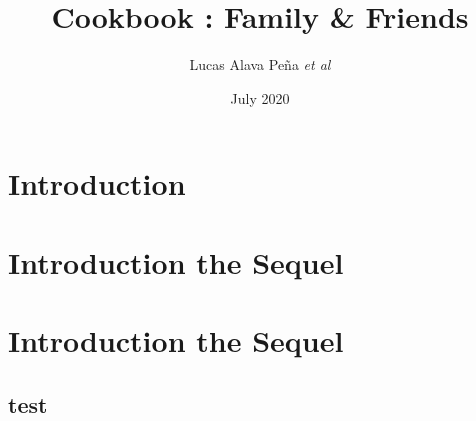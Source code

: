 \documentclass[18pt]{book}
\title{Cookbook : Family \& Friends}
\author{Lucas Alava Peña \textit{et al}}
\date{July 2020}
\begin{document}
\frontmatter






\tableofcontents

\mainmatter
\chapter{Introduction}


\chapter{Introduction the Sequel}

\blindtext

\chapter{Introduction the Sequel}

\section{test}

\blindtext

\backmatter
\end{document}
